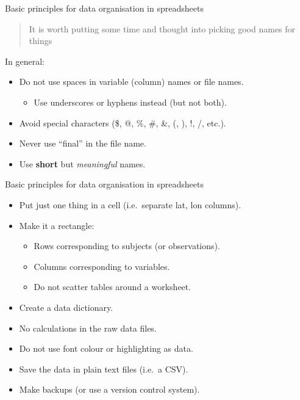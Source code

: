 \documentclass[ignorenonframetext,]{beamer}
\providecommand{\tightlist}{%
  \setlength{\itemsep}{0pt}\setlength{\parskip}{0pt}}
\begin{document}
\begin{frame}{Basic principles for data organisation in spreadsheets}

\begin{quote}
It is worth putting some time and thought into picking good names for
things
\end{quote}

In general:

\begin{itemize}
\item
  Do not use spaces in variable (column) names or file names.

  \begin{itemize}
  \tightlist
  \item
    Use underscores or hyphens instead (but not both).
  \end{itemize}
\item
  Avoid special characters (\$, @, \%, \#, \&, (, ), !, /, etc.).
\item
  Never use ``final'' in the file name.
\item
  Use \textbf{short} but \emph{meaningful} names.
\end{itemize}

\end{frame}

\begin{frame}{Basic principles for data organisation in spreadsheets}

\begin{itemize}
\item
  Put just one thing in a cell (i.e.~separate lat, lon columns).
\item
  Make it a rectangle:

  \begin{itemize}
  \tightlist
  \item
    Rows corresponding to subjects (or observations).
  \item
    Columns corresponding to variables.
  \item
    Do not scatter tables around a worksheet.
  \end{itemize}
\item
  Create a data dictionary.
\item
  No calculations in the raw data files.
\item
  Do not use font colour or highlighting as data.
\item
  Save the data in plain text files (i.e.~a CSV).
\item
  Make backups (or use a version control system).
\end{itemize}

\end{frame}
\end{document}
